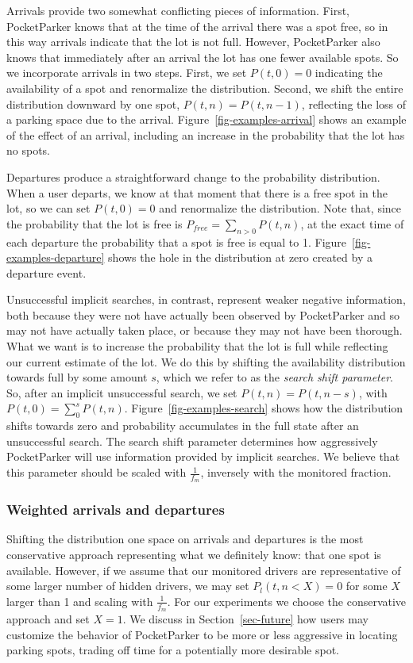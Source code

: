 Arrivals provide two somewhat conflicting pieces of information. First,
PocketParker knows that at the time of the arrival there was a spot free, so
in this way arrivals indicate that the lot is not full. However, PocketParker
also knows that immediately after an arrival the lot has one fewer available
spots. So we incorporate arrivals in two steps. First, we set $P(t, 0) = 0$
indicating the availability of a spot and renormalize the distribution.
Second, we shift the entire distribution downward by one spot, $P(t, n) =
P(t, n - 1)$, reflecting the loss of a parking space due to the arrival.
Figure~\ref{fig-examples-arrival} shows an example of the effect of an
arrival, including an increase in the probability that the lot has no spots.

Departures produce a straightforward change to the probability distribution.
When a user departs, we know at that moment that there is a free spot in the
lot, so we can set $P(t, 0) = 0$ and renormalize the distribution. Note that,
since the probability that the lot is free is $P_{free} = \sum_{n > 0} P(t,
n)$, at the exact time of each departure the probability that a spot is free
is equal to 1. Figure~\ref{fig-examples-departure} shows the hole in the
distribution at zero created by a departure event.

Unsuccessful implicit searches, in contrast, represent weaker negative
information, both because they were not have actually been observed by
PocketParker and so may not have actually taken place, or because they may
not have been thorough. What we want is to increase the probability that the
lot is full while reflecting our current estimate of the lot. We do this by
shifting the availability distribution towards full by some amount $s$, which
we refer to as the \textit{search shift parameter}. So, after an implicit
unsuccessful search, we set $P(t, n) = P(t, n - s)$, with $P(t, 0) = \sum_0^s
P(t, n)$. Figure~\ref{fig-examples-search} shows how the distribution shifts
towards zero and probability accumulates in the full state after an
unsuccessful search. The search shift parameter determines how aggressively
PocketParker will use information provided by implicit searches. We believe
that this parameter should be scaled with $\frac{1}{f_m}$, inversely with the
monitored fraction.

\subsubsection{Weighted arrivals and departures}

Shifting the distribution one space on arrivals and departures is the most
conservative approach representing what we definitely know: that one spot is
available. However, if we assume that our monitored drivers are
representative of some larger number of hidden drivers, we may set $P_l(t, n
< X) = 0$ for some $X$ larger than 1 and scaling with $\frac{1}{f_m}$. For
our experiments we choose the conservative approach and set $X = 1$. We
discuss in Section~\ref{sec-future} how users may customize the behavior of
PocketParker to be more or less aggressive in locating parking spots, trading
off time for a potentially more desirable spot.
